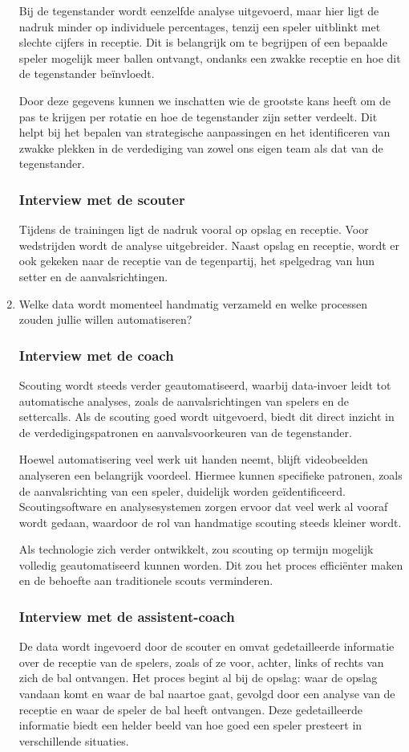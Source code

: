 \begin{enumerate}
  Bij de tegenstander wordt eenzelfde analyse uitgevoerd, maar hier ligt de nadruk minder op individuele percentages, tenzij een speler uitblinkt met slechte cijfers in receptie. Dit is belangrijk om te begrijpen of een bepaalde speler mogelijk meer ballen ontvangt, ondanks een zwakke receptie en hoe dit de tegenstander beïnvloedt.

  Door deze gegevens kunnen we inschatten wie de grootste kans heeft om de pas te krijgen per rotatie en hoe de tegenstander zijn setter verdeelt. Dit helpt bij het bepalen van strategische aanpassingen en het identificeren van zwakke plekken in de verdediging van zowel ons eigen team als dat van de tegenstander.
  \subsubsection{Interview met de scouter}
  Tijdens de trainingen ligt de nadruk vooral op opslag en receptie. Voor wedstrijden wordt de analyse uitgebreider. Naast opslag en receptie, wordt er ook gekeken naar de receptie van de tegenpartij, het spelgedrag van hun setter en de aanvalsrichtingen. 
  \item Welke data wordt momenteel handmatig verzameld en welke processen zouden jullie willen automatiseren?
  \subsubsection{Interview met de coach}
  Scouting wordt steeds verder geautomatiseerd, waarbij data-invoer leidt tot automatische analyses, zoals de aanvalsrichtingen van spelers en de settercalls. Als de scouting goed wordt uitgevoerd, biedt dit direct inzicht in de verdedigingspatronen en aanvalsvoorkeuren van de tegenstander.

  Hoewel automatisering veel werk uit handen neemt, blijft videobeelden analyseren een belangrijk voordeel. Hiermee kunnen specifieke patronen, zoals de aanvalsrichting van een speler, duidelijk worden geïdentificeerd. Scoutingsoftware en analysesystemen zorgen ervoor dat veel werk al vooraf wordt gedaan, waardoor de rol van handmatige scouting steeds kleiner wordt.

  Als technologie zich verder ontwikkelt, zou scouting op termijn mogelijk volledig geautomatiseerd kunnen worden. Dit zou het proces efficiënter maken en de behoefte aan traditionele scouts verminderen.
  \subsubsection{Interview met de assistent-coach}
  De data wordt ingevoerd door de scouter en omvat gedetailleerde informatie over de receptie van de spelers, zoals of ze voor, achter, links of rechts van zich de bal ontvangen. Het proces begint al bij de opslag: waar de opslag vandaan komt en waar de bal naartoe gaat, gevolgd door een analyse van de receptie en waar de speler de bal heeft ontvangen. Deze gedetailleerde informatie biedt een helder beeld van hoe goed een speler presteert in verschillende situaties.


\end{enumerate}
